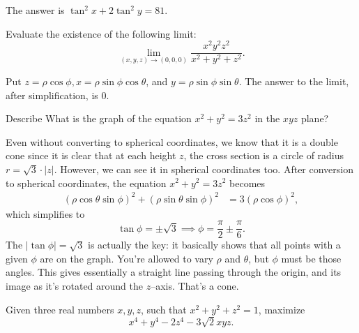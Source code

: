 \begin{solution}
	The answer is $\tan^2 x+2\tan^2 y = \boxed{81}$.
\end{solution}


\begin{question}[name={2018 Deerfield Math Competition (Extra)}]
	Evaluate the existence of the following limit: $$\lim_{(x,y,z)\to(0,0,0)}\dfrac{x^2y^2z^2}{x^2+y^2+z^2}.$$
\end{question}

\begin{solution}
	Put $z = \rho \cos \phi,	x = \rho \sin \phi \cos \theta$, and $y = \rho \sin \phi \sin \theta$. The answer to the limit, after simplification, is $0$.
\end{solution}



\begin{question} 
	Describe What is the graph of the equation $x^2+y^2 = 3z^2$ in the $xyz$ plane?
\end{question}


\begin{solution}[name={Solution by Rchokler}]
	Even without converting to spherical coordinates, we know that it is a double cone since it is clear that at each height $z$, the cross section is a circle of radius $r=\sqrt{3}\cdot|z|$. However, we can see it in spherical coordinates too. After conversion to spherical coordinates, the equation $x^2+y^2 = 3z^2$ becomes
	\begin{align*}
		(\rho\cos\theta\sin\phi)^2+(\rho\sin\theta\sin\phi)^2 &= 3(\rho\cos\phi)^2,
	\end{align*}
	which simplifies to 
	\[\tan\phi=\pm\sqrt{3}\implies\phi=\boxed{\frac{\pi}{2}\pm\frac{\pi}{6}}.\]
	The $|\tan \phi| = \sqrt{3}$ is actually the key: it basically shows that all points with a given $\phi$ are on the graph. You're allowed to vary $\rho$ and $\theta$, but $\phi$ must be those angles. This gives essentially a straight line passing through the origin, and its image as it's rotated around the $z$--axis. That's a cone.
\end{solution}



\begin{question}[name={Maximization on Sphere by WeakMathemetician}]
	Given three real numbers $x,y,z$, such that $x^2+y^2+z^2=1$, maximize $$x^4+y^4-2z^4 - 3 \sqrt{2} xyz.$$
\end{question}


